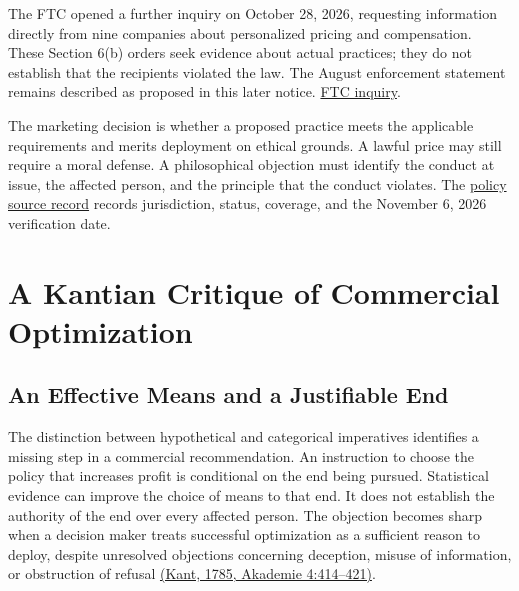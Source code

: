 The FTC opened a further inquiry on October 28, 2026, requesting
information directly from nine companies about personalized pricing and
compensation. These Section 6(b) orders seek evidence about actual
practices; they do not establish that the recipients violated the law.
The August enforcement statement remains described as proposed in this
later notice.
\href{https://www.ftc.gov/news-events/news/press-releases/2026/10/ftc-launches-personalized-pricing-compensation-inquiry}{FTC
inquiry}.

The marketing decision is whether a proposed practice meets the
applicable requirements and merits deployment on ethical grounds. A
lawful price may still require a moral defense. A philosophical
objection must identify the conduct at issue, the affected person, and
the principle that the conduct violates. The
\href{../01_Resources/16_AI_Experimentation_and_Pricing/02_Policy/README.md}{policy
source record} records jurisdiction, status, coverage, and the November
6, 2026 verification date.


\hypertarget{M09-a-kantian-critique-of-commercial-optimization}{%
\section{A Kantian Critique of Commercial
Optimization}\label{M09-a-kantian-critique-of-commercial-optimization}}

\noindent \hypertarget{M09-an-effective-means-and-a-justifiable-end}{%
\subsection{An Effective Means and a Justifiable
End}\label{M09-an-effective-means-and-a-justifiable-end}}

\noindent The distinction between hypothetical and categorical imperatives
identifies a missing step in a commercial recommendation. An instruction
to choose the policy that increases profit is conditional on the end
being pursued. Statistical evidence can improve the choice of means to
that end. It does not establish the authority of the end over every
affected person. The objection becomes sharp when a decision maker
treats successful optimization as a sufficient reason to deploy, despite
unresolved objections concerning deception, misuse of information, or
obstruction of refusal
\href{https://www.gutenberg.org/ebooks/5682}{(Kant, 1785, Akademie
4:414--421)}.

